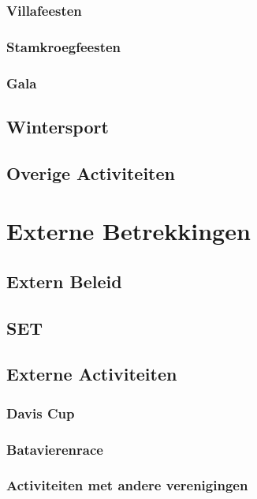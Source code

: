 \documentclass[]{article}
\begin{document}
\subsubsection{Villafeesten}

\subsubsection{Stamkroegfeesten}

\subsubsection{Gala}

\subsection{Wintersport}

\subsection{Overige Activiteiten}

\section{Externe Betrekkingen}
\subsection{Extern Beleid}

\subsection{SET}

\subsection{Externe Activiteiten}
\subsubsection{Davis Cup}

\subsubsection{Batavierenrace}

\subsubsection{Activiteiten met andere verenigingen}
\end{document}
